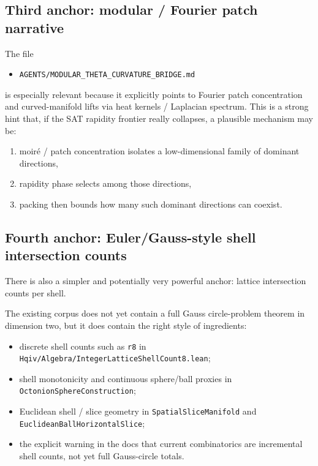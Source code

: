 \documentclass[11pt]{article}
\begin{document}
\subsection{Third anchor: modular / Fourier patch narrative}

The file

\begin{itemize}[leftmargin=2em]
  \item \texttt{AGENTS/MODULAR\_THETA\_CURVATURE\_BRIDGE.md}
\end{itemize}

is especially relevant because it explicitly points to Fourier patch concentration and curved-manifold
lifts via heat kernels / Laplacian spectrum. This is a strong hint that, if the SAT rapidity frontier
really collapses, a plausible mechanism may be:

\begin{enumerate}[leftmargin=2em]
  \item moir\'e / patch concentration isolates a low-dimensional family of dominant directions,
  \item rapidity phase selects among those directions,
  \item packing then bounds how many such dominant directions can coexist.
\end{enumerate}

\subsection{Fourth anchor: Euler/Gauss-style shell intersection counts}

There is also a simpler and potentially very powerful anchor: lattice intersection counts per shell.

The existing corpus does not yet contain a full Gauss circle-problem theorem in dimension two, but it
does contain the right style of ingredients:

\begin{itemize}[leftmargin=2em]
  \item discrete shell counts such as \texttt{r8} in
  \texttt{Hqiv/Algebra/IntegerLatticeShellCount8.lean};
  \item shell monotonicity and continuous sphere/ball proxies in
  \texttt{OctonionSphereConstruction};
  \item Euclidean shell / slice geometry in \texttt{SpatialSliceManifold} and
  \texttt{EuclideanBallHorizontalSlice};
  \item the explicit warning in the docs that current combinatorics are incremental shell counts,
  not yet full Gauss-circle totals.
\end{itemize}
\end{document}
